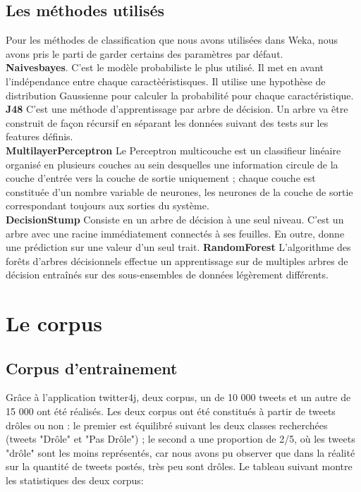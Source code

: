 \documentclass[10pt,a4paper,twoside]{article}
\begin{document}
\subsection{Les méthodes utilisés}
\label{methode}
Pour les méthodes de classification que nous avons utilisées dans Weka, nous avons pris le parti de garder certains des paramètres par défaut. \\
\textbf{Naivesbayes}. C'est le modèle probabiliste le plus utilisé. Il met en avant l'indépendance entre chaque caractèéristisques. Il utilise une hypothèse de distribution Gaussienne pour calculer la probabilité pour chaque caractéristique.\\
\textbf{J48} C'est une méthode d'apprentissage par arbre de décision. Un arbre va être construit de façon récursif en séparant les données suivant des tests sur les features définis.  \\
\textbf{MultilayerPerceptron} Le Perceptron multicouche est un classifieur linéaire organisé en plusieurs couches au sein desquelles une information circule de la couche d'entrée vers la couche de sortie uniquement ; chaque couche est constituée d'un nombre variable de neurones, les neurones de la couche de sortie correspondant toujours aux sorties du système.\\
\textbf{DecisionStump} Consiste en un arbre de décision à une seul niveau. C'est un arbre avec une racine immédiatement connectés à ses feuilles. En outre, donne une prédiction sur une valeur d'un seul trait.
\textbf{RandomForest} L'algorithme des forêts d'arbres décisionnels effectue un apprentissage sur de multiples arbres de décision entraînés sur des sous-ensembles de données légèrement différents.


\section{Le corpus}
\label{corpus}
\subsection{Corpus d'entrainement}

Grâce à l'application twitter4j, deux corpus, un de 10 000 tweets et un autre de 15 000 ont été réalisés. Les deux corpus ont été constitués à partir de tweets drôles ou non : le premier est équilibré suivant les deux classes recherchées (tweets "Drôle" et "Pas Drôle") ; le second a une proportion de 2/5, où les tweets "drôle" sont les moins représentés, car nous avons pu observer que dans la réalité sur la quantité de tweets postés, très peu sont drôles. Le tableau suivant montre les statistiques des deux corpus: 
\end{document}
